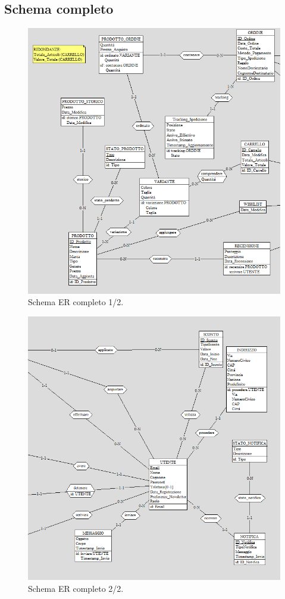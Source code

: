 \documentclass[a4paper,12pt]{report}
\begin{document}
	\subsection{Schema completo}
	\begin{figure}[H]
		\centering
		\includegraphics[width=400pt]{ER/er_completo_sx.png}
		\caption{Schema ER completo 1/2.}
	\end{figure}
	\begin{figure}[H]
		\centering
		\includegraphics[width=400pt]{ER/er_completo_dx.png}
		\caption{Schema ER completo 2/2.}
	\end{figure}
	
\end{document}
